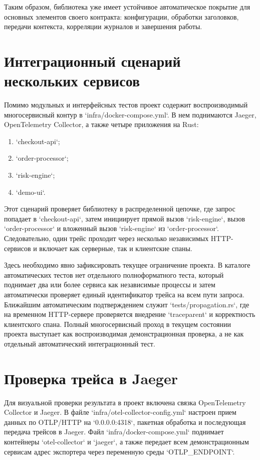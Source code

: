Таким образом, библиотека уже имеет устойчивое автоматическое покрытие для
основных элементов своего контракта: конфигурации, обработки заголовков,
передачи контекста, корреляции журналов и завершения работы.

\section{Интеграционный сценарий нескольких сервисов}

Помимо модульных и интерфейсных тестов проект содержит воспроизводимый
многосервисный контур в `infra/docker-compose.yml`. В нем поднимаются Jaeger,
OpenTelemetry Collector, а также четыре приложения на Rust:
\begin{enumerate}
    \item `checkout-api`;
    \item `order-processor`;
    \item `risk-engine`;
    \item `demo-ui`.
\end{enumerate}

Этот сценарий проверяет библиотеку в распределенной цепочке, где запрос
попадает в `checkout-api`, затем инициирует прямой вызов `risk-engine`,
вызов `order-processor` и вложенный вызов `risk-engine` из
`order-processor`. Следовательно, один трейс проходит через несколько
независимых HTTP-сервисов и включает как серверные, так и клиентские спаны.

Здесь необходимо явно зафиксировать текущее ограничение проекта. В каталоге
автоматических тестов нет отдельного полноформатного теста, который поднимает
два или более сервиса как независимые процессы и затем автоматически проверяет
единый идентификатор трейса на всем пути запроса. Ближайшим автоматическим
подтверждением служит `tests/propagation.rs`, где на временном HTTP-сервере
проверяется внедрение `traceparent` и корректность клиентского спана. Полный
многосервисный проход в текущем состоянии проекта выступает как
воспроизводимая демонстрационная проверка, а не как отдельный автоматический
интеграционный тест.

\section{Проверка трейса в Jaeger}

Для визуальной проверки результата в проект включена связка OpenTelemetry
Collector и Jaeger. В файле `infra/otel-collector-config.yml` настроен прием
данных по OTLP/HTTP на `0.0.0.0:4318`, пакетная обработка и последующая
передача трейсов в Jaeger. Файл `infra/docker-compose.yml` поднимает контейнеры
`otel-collector` и `jaeger`, а также передает всем демонстрационным сервисам
адрес экспортера через переменную среды `OTLP_ENDPOINT`.

